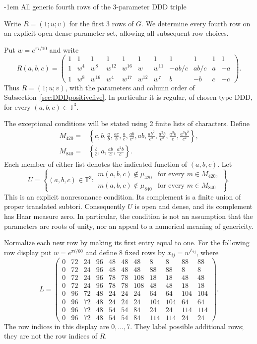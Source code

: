 \documentclass[11pt,a4paper]{article}
\makeatletter
\theoremstyle{plain}
\theoremstyle{definition}
\theoremstyle{plain}
\renewcommand\subsection{\@startsection{subsection}{2}{\z@}  {\medskipamount}  {-1em}  {\normalfont\normalsize\bfseries}}
\makeatother
\begin{document}
\subsection{All generic fourth rows of the 3-parameter DDD triple}\label{sec:DDDgenerictriple}

Write $R=(1;u;v)$ for the first $3$ rows of $G$. We determine every fourth row on an explicit open dense parameter set, allowing all subsequent row choices.

Put $w=e^{\pi i/10}$ and write
\[
R(a,b,c)=\begin{pmatrix}
1&1&1&1&1&1&1&1&1&1&1\\
1&w^{4}&w^{8}&w^{12}&w^{16}&w&w^{11}&-ab/c&ab/c&a&-a\\
1&w^{8}&w^{16}&w^{4}&w^{17}&w^{12}&w^{7}&b&-b&c&-c
\end{pmatrix}.
\]
Thus $R=(1;u;v)$, with the parameters and column order of Subsection~\ref{sec:DDDpositivefive}. In particular it is regular, of chosen type $\mathrm{DDD}$, for every $(a,b,c)\in\mathbb T^3$.

\medskip
The exceptional conditions will be stated using 2 finite lists of characters. Define
\[
\begin{split}
M_{420}={}&\left\{c,b,\frac ab,\frac{ac}b,\frac ac,
 \frac{ab}{c^2},ab,\frac{ab^2}{c^2},\frac{a^2b}{c^2},
 \frac{a^3b}c,\frac{a^3b^2}{c^2}\right\},\\
M_{840}={}&\left\{\frac bc,a,\frac{ab}c,\frac{a^2b}c\right\}.
\end{split}
\]
Each member of either list denotes the indicated function of $(a,b,c)$. Let
\[
U=\left\{(a,b,c)\in\mathbb T^3:
 \begin{array}{ll}
 m(a,b,c)\notin\mu_{420}&\text{for every }m\in M_{420},\\
 m(a,b,c)\notin\mu_{840}&\text{for every }m\in M_{840}
 \end{array}\right\}.
\]
This is an explicit nonresonance condition. Its complement is a finite union of proper translated subtori. Consequently $U$ is open and dense, and its complement has Haar measure zero. In particular, the condition is not an assumption that the parameters are roots of unity, nor an appeal to a numerical meaning of genericity.

Normalize each new row by making its first entry equal to one. For the following row display put $w=e^{\pi i/60}$ and define 8 fixed rows by $x_{ij}=w^{L_{ij}}$, where
\[
L=\begin{pmatrix}
0&72&24&96&48&48&48&8&8&88&88\\
0&72&24&96&48&48&48&88&88&8&8\\
0&72&24&96&78&78&108&18&18&48&48\\
0&72&24&96&78&78&108&48&48&18&18\\
0&96&72&48&24&24&24&64&64&104&104\\
0&96&72&48&24&24&24&104&104&64&64\\
0&96&72&48&54&54&84&24&24&114&114\\
0&96&72&48&54&54&84&114&114&24&24
\end{pmatrix}.
\]
The row indices in this display are $0,\ldots,7$. They label possible additional rows; they are not the row indices of $R$.
\end{document}
